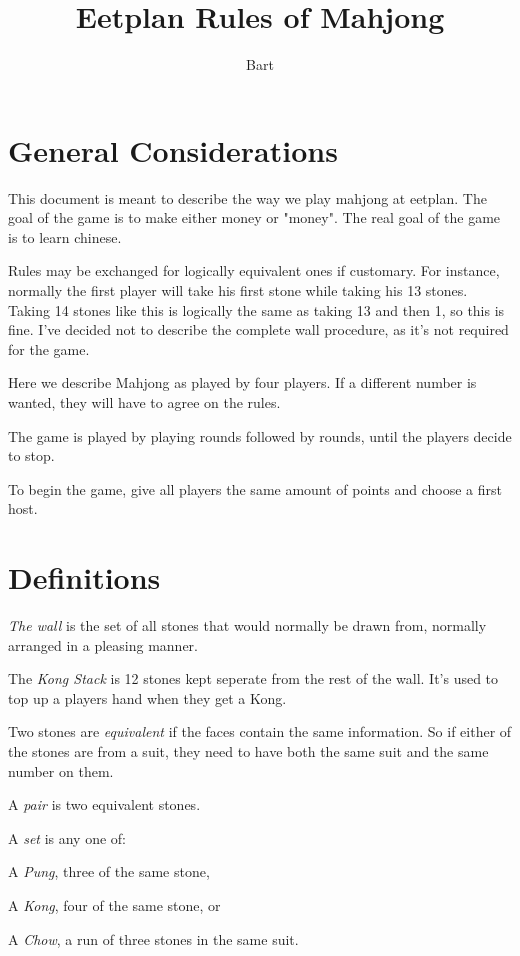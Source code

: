 \documentclass{article}
\begin{document}
\title{Eetplan Rules of Mahjong}
\author{Bart}
\maketitle

\section{General Considerations}
This document is meant to describe the way we play mahjong at eetplan. The goal of the game is to make either money or "money". The real goal of the game is to learn chinese.

Rules may be exchanged for logically equivalent ones if customary. For instance, normally the first player will take his first stone while taking his 13 stones. Taking 14 stones like this is logically the same as taking 13 and then 1, so this is fine. I've decided not to describe the complete wall procedure, as it's not required for the game.

Here we describe Mahjong as played by four players. If a different number is wanted, they will have to agree on the rules.

The game is played by playing rounds followed by rounds, until the players decide to stop.

To begin the game, give all players the same amount of points and choose a first host.

\section{Definitions}
\emph{The wall} is the set of all stones that would normally be drawn from, normally arranged in a pleasing manner.

The \emph{Kong Stack} is 12 stones kept seperate from the rest of the wall. It's used to top up a players hand when they get a Kong.

Two stones are \emph{equivalent} if the faces contain the same information. So if either of the stones are from a suit, they need to have both the same suit and the same number on them.

A \emph{pair} is two equivalent stones.

A \emph{set} is any one of:
\begin{enumerate*}
    \item A \emph{Pung}, three of the same stone,
    \item A \emph{Kong}, four of the same stone, or
    \item A \emph{Chow}, a run of three stones in the same suit.
\end{enumerate*}
\end{document}
